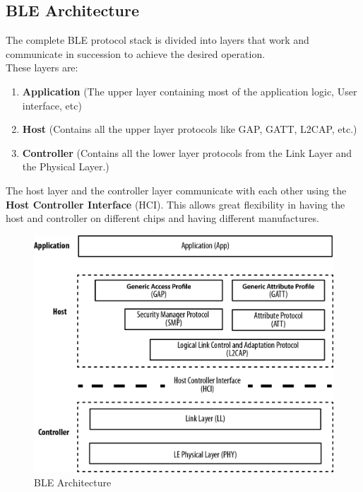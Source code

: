 \subsection{BLE Architecture}
The complete BLE protocol stack is divided into layers that work and communicate in succession to achieve the desired operation.\\
These layers are:
\begin{enumerate}
	\item \textbf{Application} (The upper layer containing most of the application logic, User interface, etc)
	\item \textbf{Host} (Contains all the upper layer protocols like GAP, GATT, L2CAP, etc.)
	\item \textbf{Controller} (Contains all the lower layer protocols from the Link Layer and the Physical Layer.)
\end{enumerate}
The host layer and the controller layer communicate with each other using the \textbf{Host Controller Interface} (HCI). This allows great flexibility in having the host and controller on different chips and having different manufactures.
\begin{figure}[ht]
	\centering
	\includegraphics[scale=0.2]{images/ble_architecture.png}
	\caption{BLE Architecture}
\end{figure}

